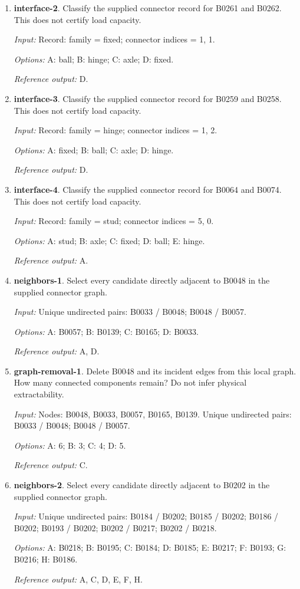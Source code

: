 \begin{enumerate}
\item \textbf{interface-2}. Classify the supplied connector record for B0261 and B0262. This does not certify load capacity.\par {\small \textit{Input:} Record: family = fixed; connector indices = 1, 1. \par\textit{Options:} A: ball; B: hinge; C: axle; D: fixed. \par\textit{Reference output:} D.}
\item \textbf{interface-3}. Classify the supplied connector record for B0259 and B0258. This does not certify load capacity.\par {\small \textit{Input:} Record: family = hinge; connector indices = 1, 2. \par\textit{Options:} A: fixed; B: ball; C: axle; D: hinge. \par\textit{Reference output:} D.}
\item \textbf{interface-4}. Classify the supplied connector record for B0064 and B0074. This does not certify load capacity.\par {\small \textit{Input:} Record: family = stud; connector indices = 5, 0. \par\textit{Options:} A: stud; B: axle; C: fixed; D: ball; E: hinge. \par\textit{Reference output:} A.}
\item \textbf{neighbors-1}. Select every candidate directly adjacent to B0048 in the supplied connector graph.\par {\small \textit{Input:} Unique undirected pairs: B0033 / B0048; B0048 / B0057. \par\textit{Options:} A: B0057; B: B0139; C: B0165; D: B0033. \par\textit{Reference output:} A, D.}
\item \textbf{graph-removal-1}. Delete B0048 and its incident edges from this local graph. How many connected components remain? Do not infer physical extractability.\par {\small \textit{Input:} Nodes: B0048, B0033, B0057, B0165, B0139. Unique undirected pairs: B0033 / B0048; B0048 / B0057. \par\textit{Options:} A: 6; B: 3; C: 4; D: 5. \par\textit{Reference output:} C.}
\item \textbf{neighbors-2}. Select every candidate directly adjacent to B0202 in the supplied connector graph.\par {\small \textit{Input:} Unique undirected pairs: B0184 / B0202; B0185 / B0202; B0186 / B0202; B0193 / B0202; B0202 / B0217; B0202 / B0218. \par\textit{Options:} A: B0218; B: B0195; C: B0184; D: B0185; E: B0217; F: B0193; G: B0216; H: B0186. \par\textit{Reference output:} A, C, D, E, F, H.}

\end{enumerate}
